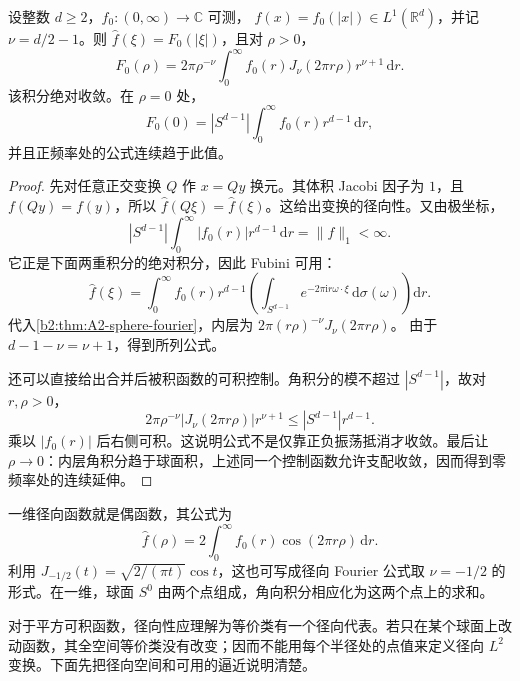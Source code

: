 \begin{theorem}[径向 Fourier 公式]
\label{b2:thm:A2-radial-fourier}
设整数 \(d\ge2\)，\(f_0:(0,\infty)\to\mathbb C\) 可测，
\(f(x)=f_0(|x|)\in L^1(\mathbb R^d)\)，并记
\(\nu=d/2-1\)。则 \(\widehat f(\xi)=F_0(|\xi|)\)，且对 \(\rho>0\)，
\[
 F_0(\rho)=2\pi\rho^{-\nu}\int_0^\infty
       f_0(r)J_\nu(2\pi r\rho)r^{\nu+1}\,\mathrm dr.
\]
该积分绝对收敛。在 \(\rho=0\) 处，
\[
 F_0(0)=|S^{d-1}|\int_0^\infty f_0(r)r^{d-1}\,\mathrm dr,
\]
并且正频率处的公式连续趋于此值。
\end{theorem}
\begin{proof}
先对任意正交变换 \(Q\) 作 \(x=Qy\) 换元。其体积 Jacobi 因子为 \(1\)，且 \(f(Qy)=f(y)\)，所以
\(\widehat f(Q\xi)=\widehat f(\xi)\)。这给出变换的径向性。又由极坐标，
\[
 |S^{d-1}|\int_0^\infty|f_0(r)|r^{d-1}\,\mathrm dr
 =\|f\|_1<\infty.
\]
它正是下面两重积分的绝对积分，因此 Fubini 可用：
\[
 \widehat f(\xi)
 =\int_0^\infty f_0(r)r^{d-1}
    \left(\int_{S^{d-1}}e^{-2\pi\mathrm i r\omega\cdot\xi}
                 \,\mathrm d\sigma(\omega)\right)\mathrm dr.
\]
代入\cref{b2:thm:A2-sphere-fourier}，内层为
\(2\pi(r\rho)^{-\nu}J_\nu(2\pi r\rho)\)。
由于 \(d-1-\nu=\nu+1\)，得到所列公式。

还可以直接给出合并后被积函数的可积控制。角积分的模不超过
\(|S^{d-1}|\)，故对 \(r,\rho>0\)，
\[
 2\pi\rho^{-\nu}|J_\nu(2\pi r\rho)|r^{\nu+1}
 \le |S^{d-1}|r^{d-1}.
\]
乘以 \(|f_0(r)|\) 后右侧可积。这说明公式不是仅靠正负振荡抵消才收敛。最后让 \(\rho\to0\)：内层角积分趋于球面积，上述同一个控制函数允许支配收敛，因而得到零频率处的连续延伸。
\end{proof}

一维径向函数就是偶函数，其公式为
\[
 \widehat f(\rho)=2\int_0^\infty f_0(r)\cos(2\pi r\rho)\,\mathrm dr.
\]
利用 \(J_{-1/2}(t)=\sqrt{2/(\pi t)}\cos t\)，这也可写成径向 Fourier 公式取 \(\nu=-1/2\) 的形式。在一维，球面 \(S^0\) 由两个点组成，角向积分相应化为这两个点上的求和。

\ProseParagraphBreak

对于平方可积函数，径向性应理解为等价类有一个径向代表。若只在某个球面上改动函数，其全空间等价类没有改变；因而不能用每个半径处的点值来定义径向 \(L^2\) 变换。下面先把径向空间和可用的逼近说明清楚。

